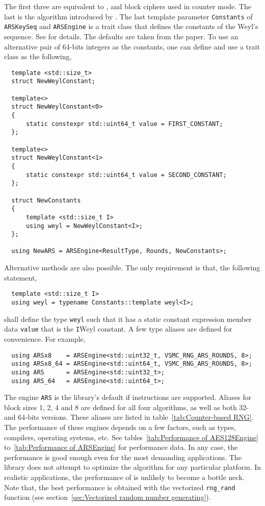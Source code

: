 The first three are equivalent to ,  and  block ciphers
used in counter mode. The last is the \ars algorithm introduced by
\textcite{Salmon:2011um}. The last template parameter \verb|Constants| of
\verb|ARSKeySeq| and \verb|ARSEngine| is a trait class that defines the
constants of the Weyl's sequence. See \textcite{Salmon:2011um} for details. The
defaults are taken from the paper. To use an alternative pair of 64-bits
integers as the constants, one can define and use a trait class as the
following,
\begin{Verbatim}
  template <std::size_t>
  struct NewWeylConstant;

  template<>
  struct NewWeylConstant<0>
  {
      static constexpr std::uint64_t value = FIRST_CONSTANT;
  };

  template<>
  struct NewWeylConstant<1>
  {
      static constexpr std::uint64_t value = SECOND_CONSTANT;
  };

  struct NewConstants
  {
      template <std::size_t I>
      using weyl = NewWeylConstant<I>;
  };

  using NewARS = ARSEngine<ResultType, Rounds, NewConstants>;
\end{Verbatim}
Alternative methods are also possible. The only requirement is that, the
following statement,
\begin{Verbatim}
  template <std::size_t I>
  using weyl = typename Constants::template weyl<I>;
\end{Verbatim}
shall define the type \verb|weyl| such that it has a static constant expression
member data \verb|value| that is the \verb|I|\ith Weyl constant. A few type
aliases are defined for convenience. For example,
\begin{Verbatim}
  using ARSx8    = ARSEngine<std::uint32_t, VSMC_RNG_ARS_ROUNDS, 8>;
  using ARSx8_64 = ARSEngine<std::uint64_t, VSMC_RNG_ARS_ROUNDS, 8>;
  using ARS      = ARSEngine<std::uint32_t>;
  using ARS_64   = ARSEngine<std::uint64_t>;
\end{Verbatim}
The engine \verb|ARS| is the library's default \rng if \aesni instructions are
supported. Aliases for block sizes 1, 2, 4 and 8 are defined for all four
algorithms, as well as both 32- and 64-bits versions. These aliases are listed
in table~\ref{tab:Counter-based RNG}. The performance of these engines depends
on a few factors, such as \cpu types, compilers, operating systems, etc. See
tables~\ref{tab:Performance of AES128Engine} to~\ref{tab:Performance of
  ARSEngine} for performance data. In any case, the performance is good enough
even for the most demanding applications. The library does not attempt to
optimize the algorithm for any particular platform. In realistic applications,
the performance of \rng is unlikely to become a bottle neck. Note that, the
best performance is obtained with the vectorized \verb|rng_rand| function (see
section~\ref{sec:Vectorized random number generating}).

